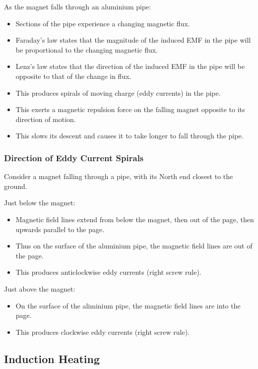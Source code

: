 \documentclass[a4paper,11pt]{report}
\begin{document}
As the magnet falls through an aluminium pipe:

\begin{itemize}
\item Sections of the pipe experience a changing magnetic flux.
\item Faraday's law states that the magnitude of the induced EMF in the pipe
	will be proportional to the changing magnetic flux.
\item Lenz's law states that the direction of the induced EMF in the pipe will
	be opposite to that of the change in flux.
\item This produces spirals of moving charge (eddy currents) in the pipe.
\item This exerts a magnetic repulsion force on the falling magnet opposite to
	its direction of motion.
\item This slows its descent and causes it to take longer to fall through the
	pipe.
\end{itemize}

\subsubsection{Direction of Eddy Current Spirals}

Consider a magnet falling through a pipe, with its North end closest to the
ground.

Just below the magnet:

\begin{itemize}
\item Magnetic field lines extend from below the magnet, then out of the page,
	then upwards parallel to the page.
\item Thus on the surface of the aluminium pipe, the magnetic field lines
	are out of the page.
\item This produces anticlockwise eddy currents (right screw rule).
\end{itemize}

Just above the magnet:

\begin{itemize}
\item On the surface of the aliminium pipe, the magnetic field lines are into
	the page.
\item This produces clockwise eddy currents (right screw rule).
\end{itemize}

\subsection{Induction Heating}
\end{document}

